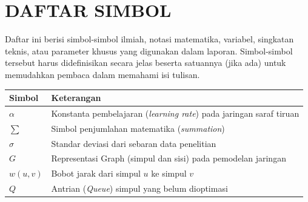 \clearpage
\chapter*{DAFTAR SIMBOL}

Daftar ini berisi simbol-simbol ilmiah, notasi matematika, variabel, singkatan teknis, atau parameter khusus yang digunakan dalam laporan. Simbol-simbol tersebut harus didefinisikan secara jelas beserta satuannya (jika ada) untuk memudahkan pembaca dalam memahami isi tulisan.

\begin{longtable}{ll}
\textbf{Simbol} & \textbf{Keterangan} \\
\hline
$\alpha$ & Konstanta pembelajaran (\textit{learning rate}) pada jaringan saraf tiruan \\
$\sum$ & Simbol penjumlahan matematika (\textit{summation}) \\
$\sigma$ & Standar deviasi dari sebaran data penelitian \\
$G$ & Representasi Graph (simpul dan sisi) pada pemodelan jaringan \\
$w(u,v)$ & Bobot jarak dari simpul $u$ ke simpul $v$ \\
$Q$ & Antrian (\textit{Queue}) simpul yang belum dioptimasi \\
\hline
\end{longtable}
